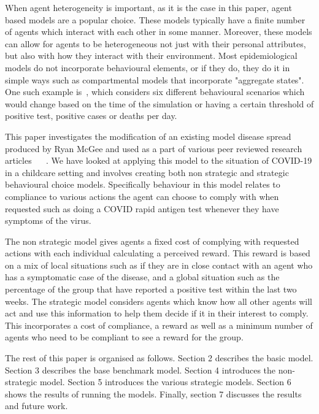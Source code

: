 \documentclass{article}
\begin{document}
When agent heterogeneity is important, as it is the case in this paper, agent based models are a popular choice. 
These models typically have a finite number of agents which interact with each other in some manner.
Moreover, these models can allow for agents to be heterogeneous not just with their personal attributes, but also with how they interact with their environment.\newline
Most epidemiological models do not incorporate behavioural elements, or if they do, they do it in simple ways such as compartmental models that incorporate "aggregate states". One such example is~\cite{karaivanov_2020}, which considers six different behavioural scenarios which would change based on the time of the simulation or having a certain threshold of positive test, positive cases or deaths per day.\newline

This paper investigates the modification of an existing model disease spread produced by Ryan McGee and used as a part of various peer reviewed research articles ~\cite{mcgee_homburger_williams_bergstrom_zhou_2021} ~\cite{mcgee_homburger_williams_bergstrom_zhou_2021_2}. 
We have looked at applying this model to the situation of COVID-19 in a childcare setting and involves creating both non strategic and strategic behavioural choice models. Specifically behaviour in this model relates to compliance to various actions the agent can choose to comply with when requested such as doing a COVID rapid antigen test whenever they have symptoms of the virus. \newline

The non strategic model gives agents a fixed cost of complying with requested actions with each individual calculating a perceived reward. This reward is based on a mix of local situations such as if they are in close contact with an agent who has a symptomatic case of the disease, and a global situation such as the percentage of the group that have reported a positive test within the last two weeks. The strategic model considers agents which know how all other agents will act and use this information to help them decide if it in their interest to comply. This incorporates a cost of compliance, a reward as well as a minimum number of agents who need to be compliant to see a reward for the group. \newline

The rest of this paper is organised as follows. Section 2 describes the basic model. Section 3 describes the base benchmark model. Section 4 introduces the non-strategic model. Section 5 introduces the various strategic models. Section 6 shows the results of running the models. Finally, section 7 discusses the results and future work.
\end{document}
